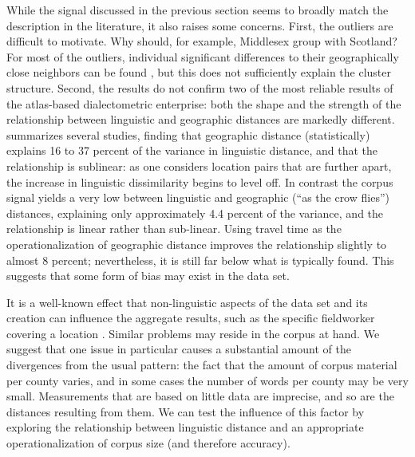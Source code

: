 \documentclass[output=paper]{LSP/langsci}
\begin{document}
While the signal discussed in the previous section seems to broadly match the description in the literature, it also raises some concerns.
First, the outliers are difficult to motivate.
Why should, for example, Middlesex group with Scotland?
For most of the outliers, individual significant differences to their geographically close neighbors can be found \citep[chapter 7]{szmrecsanyi_grammatical_2013}, but this does not sufficiently explain the cluster structure.
Second, the results do not confirm two of the most reliable results of the atlas-based dialectometric enterprise: both the shape and the strength of the relationship between linguistic and geographic distances are markedly different.
\citet{nerbonne_how_2013} summarizes several studies, finding that geographic distance (statistically) explains 16 to 37 percent of the variance in linguistic distance, and that the relationship is sublinear: as one considers location pairs that are further apart, the increase in linguistic dissimilarity begins to level off.
In contrast the corpus signal yields a very low  between linguistic and geographic (``as the crow flies'') distances, explaining only approximately 4.4 percent of the variance, and the relationship is linear rather than sub-linear.
Using travel time as the operationalization of geographic distance \citep{gooskens_traveling_2005} improves the relationship slightly to almost 8 percent; nevertheless, it is still far below what is typically found.
This suggests that some form of bias may exist in the data set.

It is a well-known effect that non-linguistic aspects of the data set and its creation can influence the aggregate results, such as the specific fieldworker covering a location \citep[``field worker isoglosses'', ][241ff.]{trudgill_contribution_1982}.
Similar problems may reside in the corpus at hand.
We suggest that one issue in particular causes a substantial amount of the divergences from the usual pattern: the fact that the amount of corpus material per county varies, and in some cases the number of words per county may be very small.
Measurements that are based on little data are imprecise, and so are the distances resulting from them.
We can test the influence of this factor by exploring the relationship between linguistic distance and an appropriate operationalization of corpus size (and therefore accuracy).
\end{document}
